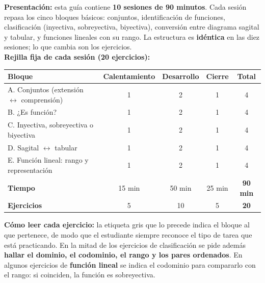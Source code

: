 \documentclass[12pt, letterpaper]{article}
\begin{document}


\vspace{4pt}
\begin{cuadroinfo}
  \small
  \textbf{Presentación:} esta guía contiene \textbf{10 sesiones de 90 minutos}. Cada sesión repasa los cinco bloques básicos: conjuntos, identificación de funciones, clasificación (inyectiva, sobreyectiva, biyectiva), conversión entre diagrama sagital y tabular, y funciones lineales con su rango. La estructura es \textbf{idéntica} en las diez sesiones; lo que cambia son los ejercicios.
  \\[4pt]
  \textbf{Rejilla fija de cada sesión (20 ejercicios):}
  \begin{center}
    \small
    \begin{tabular}{@{}l ccc c@{}}
      \toprule
      \textbf{Bloque} & \textbf{Calentamiento} & \textbf{Desarrollo} & \textbf{Cierre} & \textbf{Total} \\
      \midrule
      A. Conjuntos (extensión $\leftrightarrow$ comprensión)     & 1 & 2 & 1 & 4 \\
      B. ¿Es función?                             & 1 & 2 & 1 & 4 \\
      C. Inyectiva, sobreyectiva o biyectiva      & 1 & 2 & 1 & 4 \\
      D. Sagital $\leftrightarrow$ tabular        & 1 & 2 & 1 & 4 \\
      E. Función lineal: rango y representación   & 1 & 2 & 1 & 4 \\
      \midrule
      \textbf{Tiempo}                             & 15 min & 50 min & 25 min & \textbf{90 min} \\
      \textbf{Ejercicios}                         & 5 & 10 & 5 & \textbf{20} \\
      \bottomrule
    \end{tabular}
  \end{center}
  \textbf{Cómo leer cada ejercicio:} la etiqueta gris que lo precede indica el bloque al que pertenece, de modo que el estudiante siempre reconoce el tipo de tarea que está practicando. En la mitad de los ejercicios de clasificación se pide además \textbf{hallar el dominio, el codominio, el rango y los pares ordenados}. En algunos ejercicios de \textbf{función lineal} se indica el codominio para compararlo con el rango: si coinciden, la función es sobreyectiva.

\end{cuadroinfo}
\end{document}
